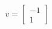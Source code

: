 \documentclass[preview]{standalone}
\begin{document}
\begin{align*}
v = \begin{bmatrix} -1 \\ 1 \end{bmatrix}
\end{align*}
\end{document}

